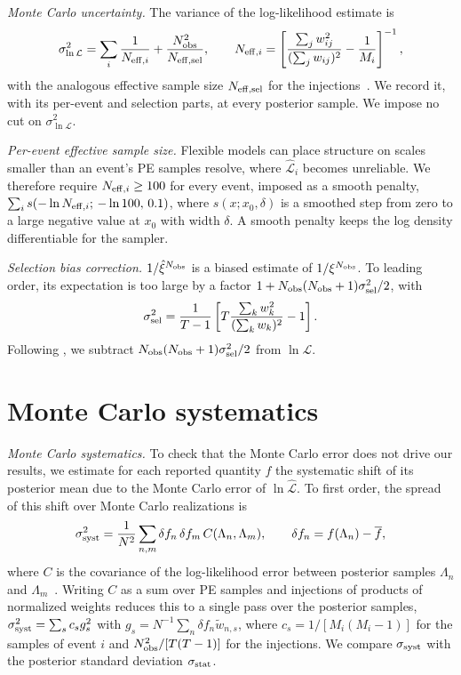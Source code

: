\documentclass[%
 onecolumn,
 amsmath,amssymb,
 aps,
 prl,
 nofootinbib,nobibnotes,
]{revtex4-2}
\begin{document}
\textit{Monte Carlo uncertainty.} The variance of the log-likelihood estimate is
\begin{equation}
    \sigma^2_{\ln \mathcal{L}} = \sum_i \frac{1}{N_{{\rm eff}, i}} + \frac{N_{\rm obs}^2}{N_{\rm eff, sel}}, \qquad
    N_{{\rm eff}, i} = \left[\frac{\sum_j w_{ij}^2}{(\sum_j w_{ij})^2} - \frac{1}{M_i}\right]^{-1},
\end{equation}
with the analogous effective sample size $N_{\rm eff, sel}$ for the injections~\cite{Farr:2019rap, Essick:2022ojx, Talbot:2023pex}. We record it, with its per-event and selection parts, at every posterior sample. We impose no cut on $\sigma^2_{\ln\mathcal{L}}$.

\textit{Per-event effective sample size.} Flexible models can place structure on scales smaller than an event's \ac{PE} samples resolve, where $\hat{\mathcal{L}}_i$ becomes unreliable. We therefore require $N_{{\rm eff}, i} \geq 100$ for every event, imposed as a smooth penalty, $\sum_i s(-\ln N_{{\rm eff}, i};\, -\ln 100,\, 0.1)$, where $s(x; x_0, \delta)$ is a smoothed step from zero to a large negative value at $x_0$ with width $\delta$. A smooth penalty keeps the log density differentiable for the sampler.

\textit{Selection bias correction.} $1/\hat{\xi}^{N_{\rm obs}}$ is a biased estimate of $1/\xi^{N_{\rm obs}}$. To leading order, its expectation is too large by a factor $1 + N_{\rm obs}(N_{\rm obs} + 1)\sigma_{\rm sel}^2/2$, with
\begin{equation}
    \sigma_{\rm sel}^2 = \frac{1}{T - 1}\left[T\frac{\sum_k w_k^2}{(\sum_k w_k)^2} - 1\right].
\end{equation}
Following \citet{Heinzel:2025ogf}, we subtract $N_{\rm obs}(N_{\rm obs} + 1)\sigma^2_{\rm sel}/2$ from $\ln \mathcal{L}$.

\section{Monte Carlo systematics}
\label{sm: mc}

\textit{Monte Carlo systematics.} To check that the Monte Carlo error does not drive our results, we estimate for each reported quantity $f$ the systematic shift of its posterior mean due to the Monte Carlo error of $\ln \hat{\mathcal{L}}$. To first order, the spread of this shift over Monte Carlo realizations is
\begin{equation}
    \sigma^2_{\rm syst} = \frac{1}{N^2} \sum_{n, m} \delta f_n\, \delta f_m\, C(\Lambda_n, \Lambda_m), \qquad \delta f_n = f(\Lambda_n) - \overline{f},
\end{equation}
where $C$ is the covariance of the log-likelihood error between posterior samples $\Lambda_n$ and $\Lambda_m$~\cite{Heinzel:2025ogf}. Writing $C$ as a sum over \ac{PE} samples and injections of products of normalized weights reduces this to a single pass over the posterior samples, $\sigma^2_{\rm syst} = \sum_s c_s g_s^2$ with $g_s = N^{-1}\sum_n \delta f_n \tilde{w}_{n, s}$, where $c_s = 1/[M_i(M_i - 1)]$ for the samples of event $i$ and $N_{\rm obs}^2/[T(T - 1)]$ for the injections. We compare $\sigma_{\rm syst}$ with the posterior standard deviation $\sigma_{\rm stat}$. 
\end{document}
